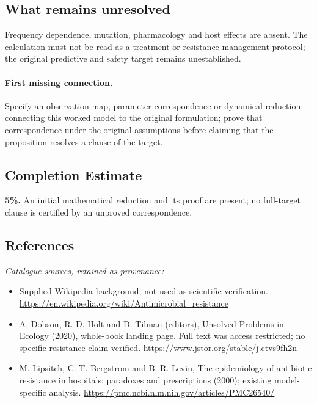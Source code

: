 \documentclass[11pt]{article}
\begin{document}
\subsection{What remains unresolved}
Frequency dependence, mutation, pharmacology and host effects are absent. The calculation must not be read as a treatment or resistance-management protocol; the original predictive and safety target remains unestablished.
\paragraph{First missing connection.} Specify an observation map, parameter correspondence or dynamical reduction connecting this worked model to the original formulation; prove that correspondence under the original assumptions before claiming that the proposition resolves a clause of the target.
\subsection{Completion Estimate}
\textbf{5\%.} An initial mathematical reduction and its proof are present; no full-target clause is certified by an unproved correspondence.
\subsection{References}
\noindent\emph{Catalogue sources, retained as provenance:}
\begin{itemize}
\item Supplied Wikipedia background; not used as scientific verification. \url{https://en.wikipedia.org/wiki/Antimicrobial_resistance}
\item A. Dobson, R. D. Holt and D. Tilman (editors), Unsolved Problems in Ecology (2020), whole-book landing page. Full text was access restricted; no specific resistance claim verified. \url{https://www.jstor.org/stable/j.ctvs9fh2n}
\item M. Lipsitch, C. T. Bergstrom and B. R. Levin, The epidemiology of antibiotic resistance in hospitals: paradoxes and prescriptions (2000); existing model-specific analysis. \url{https://pmc.ncbi.nlm.nih.gov/articles/PMC26540/}
\end{itemize}
\clearpage


\appendix
\end{document}
